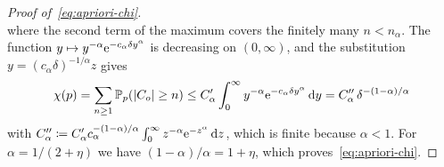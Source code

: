 \begin{proof}[Proof of~\eqref{eq:apriori-chi}]
\begin{equation*}
\end{equation*}
where the second term of the maximum covers the finitely many $n<n_\alpha$. The function
$y\mapsto y^{-\alpha}\mathrm{e}^{-c_\alpha\delta y^\alpha}$ is decreasing on $(0,\infty)$, and the substitution
$y=(c_\alpha\delta)^{-1/\alpha}z$ gives
\begin{equation*}
  \chi(p)=\sum_{n\ge1}\mathbb P_p(\lvert C_o\rvert\ge n)\le C'_\alpha\int_0^\infty y^{-\alpha}\mathrm{e}^{-c_\alpha\delta y^\alpha}\,\mathrm{d} y
  =C''_\alpha\,\delta^{-(1-\alpha)/\alpha}
\end{equation*}
with $C''_\alpha\coloneqq C'_\alpha c_\alpha^{-(1-\alpha)/\alpha}\int_0^\infty z^{-\alpha}\mathrm{e}^{-z^\alpha}\,\mathrm{d} z$, which is finite because
$\alpha<1$. For $\alpha=1/(2+\eta)$ we have $(1-\alpha)/\alpha=1+\eta$, which
proves~\eqref{eq:apriori-chi}.
\end{proof}
